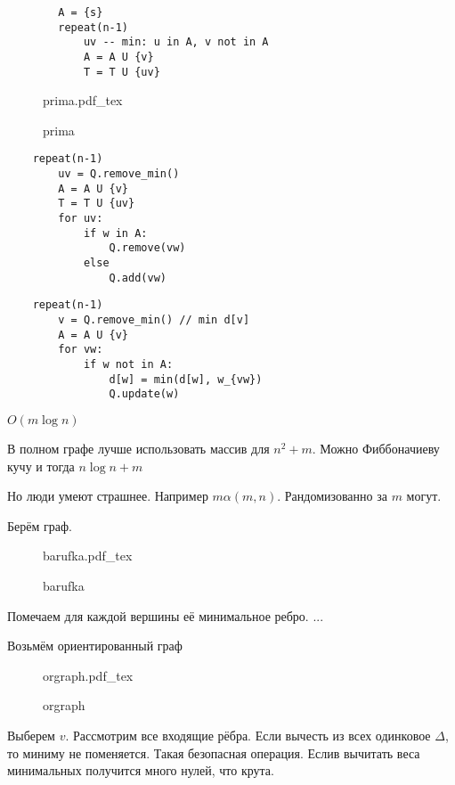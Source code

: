 \documentclass{book}
\theoremstyle{definition}
\newcommand{\incfig}[1]{%
    \def\svgwidth{\columnwidth}
    {#1.pdf_tex}
}
\begin{document}
\begin{statement}
$\ $ \\
    \begin{lstlisting}
        A = {s}
        repeat(n-1)
            uv -- min: u in A, v not in A
            A = A U {v}
            T = T U {uv}
    \end{lstlisting}
\end{statement}
\begin{figure}[!ht]
    \centering
    \incfig{prima}
    \caption{prima}
    \label{fig:prima}
\end{figure}

\begin{lstlisting}
    repeat(n-1)
        uv = Q.remove_min()
        A = A U {v}
        T = T U {uv}
        for uv:
            if w in A:
                Q.remove(vw)
            else  
                Q.add(vw)
\end{lstlisting}

\begin{lstlisting}
    repeat(n-1)
        v = Q.remove_min() // min d[v]
        A = A U {v}
        for vw:
            if w not in A:
                d[w] = min(d[w], w_{vw})
                Q.update(w)
\end{lstlisting}

$O\left( m\log n \right) $

В полном графе лучше использовать массив для $n^2+m$. Можно Фиббоначиеву кучу и тогда $n\log n + m$

Но люди умеют страшнее. Например $m \alpha(m,n)$. Рандомизованно за  $m$ могут.

\begin{statement}
    [Баруфка]
    Берём граф. 
\end{statement}

\begin{figure}[!ht]
    \centering
    \incfig{barufka}
    \caption{barufka}
    \label{fig:barufka}
\end{figure}

Помечаем для каждой вершины её минимальное ребро.
...


Возьмём ориентированный граф
\begin{figure}[!ht]
    \centering
    \incfig{orgraph}
    \caption{orgraph}
    \label{fig:orgraph}
\end{figure}


\begin{statement}
    Выберем $v$. Рассмотрим все входящие рёбра. Если вычесть из всех одинковое  $\Delta$, то миниму не поменяется. Такая безопасная операция. Еслив вычитать веса минимальных получится много нулей, что крута.
\end{statement}
\end{document}
